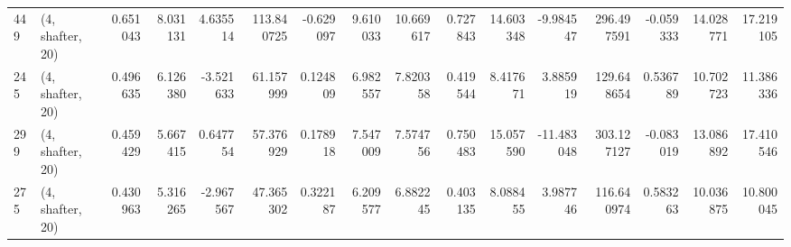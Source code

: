 \begin{tabular}{llrrrrrrrrrrrrrr}
449 &  (4, shafter, 20) &   0.651043 &   8.031131 &   4.635514 &   113.840725 &  -0.629097 &   9.610033 &  10.669617 &  0.727843 &  14.603348 &  -9.984547 &   296.497591 & -0.059333 &  14.028771 &  17.219105 \\
245 &  (4, shafter, 20) &   0.496635 &   6.126380 &  -3.521633 &    61.157999 &   0.124809 &   6.982557 &   7.820358 &  0.419544 &   8.417671 &   3.885919 &   129.648654 &  0.536789 &  10.702723 &  11.386336 \\
299 &  (4, shafter, 20) &   0.459429 &   5.667415 &   0.647754 &    57.376929 &   0.178918 &   7.547009 &   7.574756 &  0.750483 &  15.057590 & -11.483048 &   303.127127 & -0.083019 &  13.086892 &  17.410546 \\
275 &  (4, shafter, 20) &   0.430963 &   5.316265 &  -2.967567 &    47.365302 &   0.322187 &   6.209577 &   6.882245 &  0.403135 &   8.088455 &   3.987746 &   116.640974 &  0.583263 &  10.036875 &  10.800045 \\
\bottomrule
\end{tabular}
